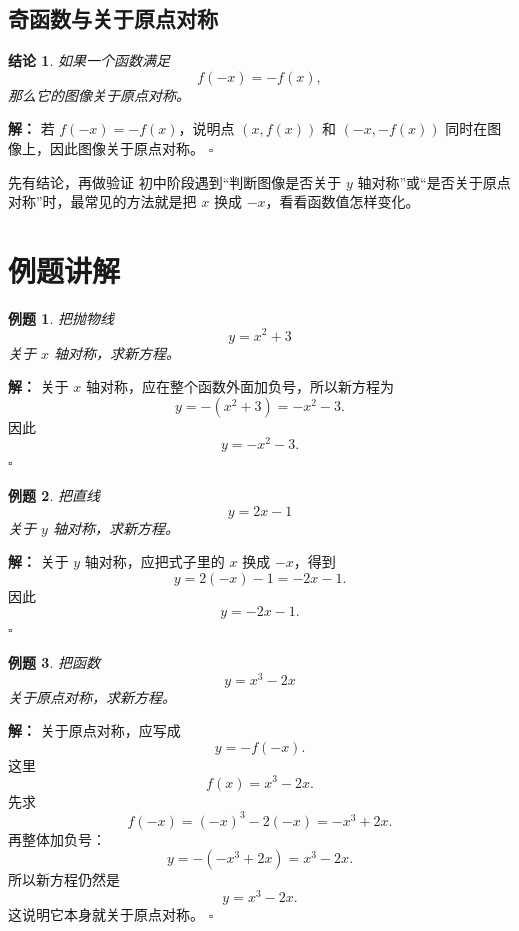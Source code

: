 \documentclass[11pt,a4paper,fontset=fandol]{ctexart}
\theoremstyle{formaltheorem}
\newtheorem{theorem}{结论}[section]
\theoremstyle{formalexample}
\newtheorem{example}{例题}[section]
\newenvironment{solution}{\par\noindent\textbf{解：}}{\hfill$\square$\par}
\begin{document}
\subsection{奇函数与关于原点对称}

\begin{theorem}
如果一个函数满足
\[
f(-x)=-f(x),
\]
那么它的图像关于原点对称。
\end{theorem}

\begin{solution}
若 $f(-x)=-f(x)$，说明点 $(x,f(x))$ 和 $(-x,-f(x))$ 同时在图像上，因此图像关于原点对称。
\end{solution}

\begin{notebox}{先有结论，再做验证}
初中阶段遇到“判断图像是否关于 $y$ 轴对称”或“是否关于原点对称”时，最常见的方法就是把 $x$ 换成 $-x$，看看函数值怎样变化。
\end{notebox}

\section{例题讲解}

\begin{example}
把抛物线
\[
y=x^2+3
\]
关于 $x$ 轴对称，求新方程。
\end{example}

\begin{solution}
关于 $x$ 轴对称，应在整个函数外面加负号，所以新方程为
\[
y=-(x^2+3)=-x^2-3.
\]
因此
\[
\boxed{y=-x^2-3}.
\]
\end{solution}

\begin{example}
把直线
\[
y=2x-1
\]
关于 $y$ 轴对称，求新方程。
\end{example}

\begin{solution}
关于 $y$ 轴对称，应把式子里的 $x$ 换成 $-x$，得到
\[
y=2(-x)-1=-2x-1.
\]
因此
\[
\boxed{y=-2x-1}.
\]
\end{solution}

\begin{example}
把函数
\[
y=x^3-2x
\]
关于原点对称，求新方程。
\end{example}

\begin{solution}
关于原点对称，应写成
\[
y=-f(-x).
\]
这里
\[
f(x)=x^3-2x.
\]
先求
\[
f(-x)=(-x)^3-2(-x)=-x^3+2x.
\]
再整体加负号：
\[
y=-(-x^3+2x)=x^3-2x.
\]
所以新方程仍然是
\[
\boxed{y=x^3-2x}.
\]
这说明它本身就关于原点对称。
\end{solution}
\end{document}
